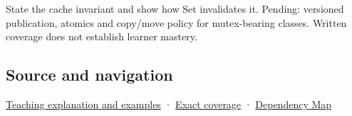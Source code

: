 State the cache invariant and show how Set invalidates it. Pending: versioned publication, atomics and copy/move policy for mutex-bearing classes. Written coverage does not establish learner mastery.

\subsection{Source and navigation}\label{appendix-f5593256bcaf-source-and-navigation}

\hyperref[01-foundations-i-ch003-a-cache-may-change-bits-without-changing-meaning]{Teaching explanation and examples} · \hyperref[appendix-fd090d982a15-m008---parts-113-126]{Exact coverage} · \hyperref[appendix-4ad47bdd269a]{Dependency Map}
